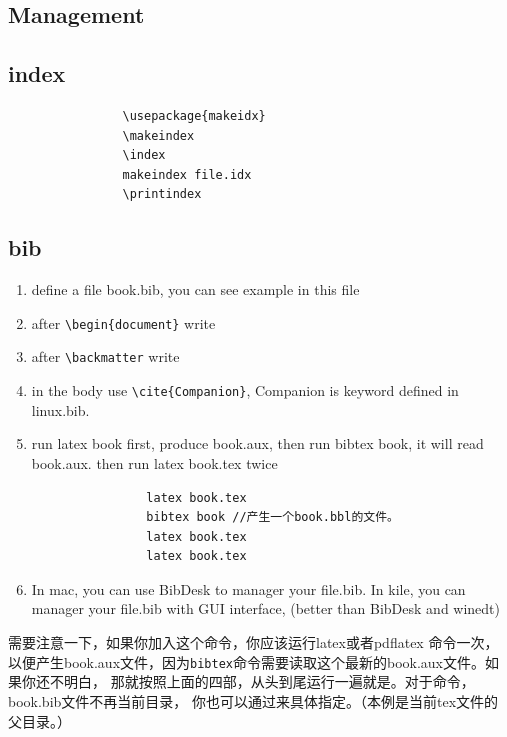 \documentclass[a4paper,12pt,twoside]{book}
\begin{document}
\begin{CJK*}{UTF8}{song}
\section{Management}	
	\subsection{index}
			\begin{verbatim}
				\usepackage{makeidx}
				\makeindex
				\index
				makeindex file.idx
				\printindex
			\end{verbatim}	
	\subsection{bib}
		\begin{enumerate}
			\item define a file book.bib, you can see example in this file
			\item after \verb=\begin{document}= write \verb==
			\item after \verb=\backmatter= write \verb==
			\item in the body use \verb=\cite{Companion}=, Companion is keyword defined in linux.bib.
			\item run latex book first, produce book.aux, then run bibtex book, it will read book.aux. then run latex book.tex twice
				\begin{verbatim}
				latex book.tex
				bibtex book //产生一个book.bbl的文件。
				latex book.tex
				latex book.tex
				\end{verbatim}
			\item In mac, you can use BibDesk to manager your file.bib. In kile, you can manager your file.bib with GUI interface, (better than BibDesk and winedt)
			\end{enumerate}
        需要注意一下，如果你加入\verb==这个命令，你应该运行latex或者pdflatex 命令一次，以便产生book.aux文件，因为\verb=bibtex=命令需要读取这个最新的book.aux文件。如果你还不明白， 那就按照上面的四部，从头到尾运行一遍就是。对于\verb==命令，book.bib文件不再当前目录， 你也可以通过\verb==来具体指定。（本例是当前tex文件的父目录。）

\end{CJK*}
\end{document}
